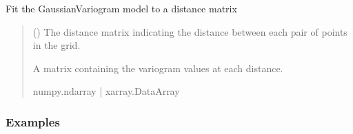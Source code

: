 \documentclass[letterpaper,10pt,english]{sphinxmanual}
\begin{document}
\begin{fulllineitems}
\begin{quote}
\begin{description}
\begin{itemize}
\end{itemize}

\end{description}\end{quote}

\begin{fulllineitems}
\label{\detokenize{covariance:glomar_gridding.variogram.GaussianVariogram.fit}}
\pysigstartsignatures
\pysiglinewithargsret
{}
{}
{}
\pysigstopsignatures
\sphinxAtStartPar
Fit the GaussianVariogram model to a distance matrix
\begin{quote}\begin{description}
\sphinxAtStartPar
{} (\sphinxstyleliteralemphasis{\sphinxupquote{ | }}) \textendash{} The distance matrix indicating the distance between each pair of
points in the grid.

\sphinxAtStartPar
A matrix containing the variogram values at each distance.

\sphinxAtStartPar
numpy.ndarray | xarray.DataArray

\end{description}\end{quote}
\subsubsection*{Examples}

\begin{sphinxVerbatim}[commandchars=\\\{\}]
  
\end{sphinxVerbatim}

\end{fulllineitems}


\end{fulllineitems}
\end{document}
